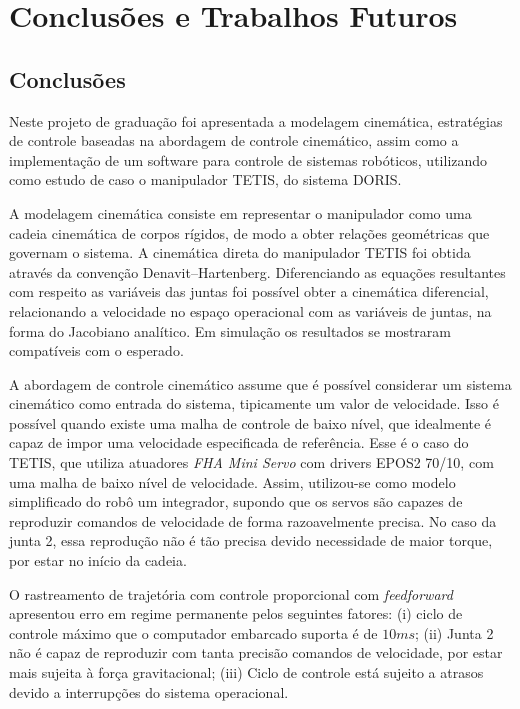\chapter{Conclusões e Trabalhos Futuros}

\section{Conclusões}

Neste projeto de graduação foi apresentada a modelagem cinemática, estratégias de controle baseadas na abordagem de controle cinemático, assim como a implementação de um software para controle de sistemas robóticos, utilizando como estudo de caso o manipulador TETIS, do sistema DORIS. 

A modelagem cinemática consiste em representar o manipulador como uma cadeia cinemática de corpos rígidos, de modo a obter relações geométricas que governam o sistema. A cinemática direta do manipulador TETIS foi obtida através da convenção Denavit–Hartenberg. Diferenciando as equações resultantes com respeito as variáveis das juntas foi possível obter a cinemática diferencial, relacionando a velocidade no espaço operacional com as variáveis de juntas, na forma do Jacobiano analítico. Em simulação os resultados se mostraram compatíveis com o esperado. 

A abordagem de controle cinemático assume que é possível considerar um sistema cinemático como entrada do sistema, tipicamente um valor de velocidade. Isso é possível quando existe uma malha de controle de baixo nível, que idealmente é capaz de impor uma velocidade especificada de referência. Esse é o caso do TETIS, que utiliza atuadores \textit{FHA Mini Servo} com drivers EPOS2 70/10, com uma malha de baixo nível de velocidade. Assim, utilizou-se como modelo simplificado do robô um integrador, supondo que os servos são capazes de reproduzir comandos de velocidade de forma razoavelmente precisa. No caso da junta 2, essa reprodução não é tão precisa devido necessidade de maior torque, por estar no início da cadeia.

O rastreamento de trajetória com controle proporcional com \textit{feedforward} apresentou erro em regime permanente pelos seguintes fatores: (i) ciclo de controle máximo que o computador embarcado suporta é de $10ms$; (ii) Junta 2 não é capaz de reproduzir com tanta precisão comandos de velocidade, por estar mais sujeita à força gravitacional; (iii) Ciclo de controle está sujeito a atrasos devido a interrupções do sistema operacional. 

